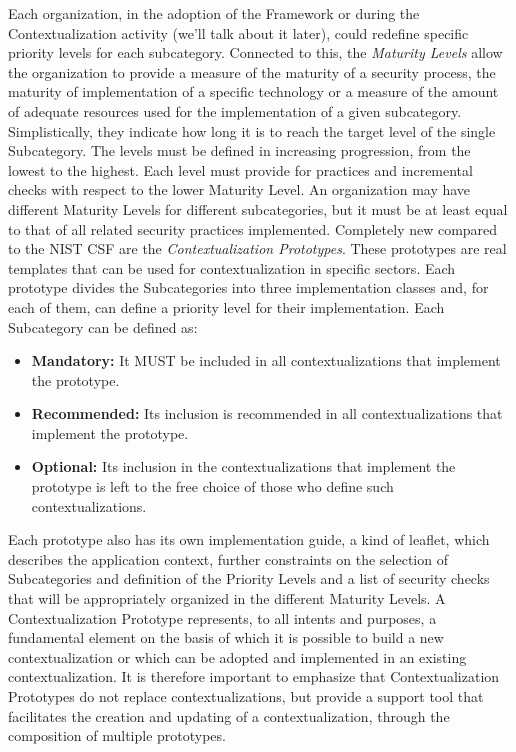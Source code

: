 Each organization, in the adoption of the Framework or during the Contextualization activity (we'll talk about it later), could redefine specific priority levels for each subcategory. Connected to this, the \textit{Maturity Levels} allow the organization to provide a measure of the maturity of a security process, the maturity of implementation of a specific technology or a measure of the amount of adequate resources used for the implementation of a given subcategory. Simplistically, they indicate how long it is to reach the target level of the single Subcategory. The levels must be defined in increasing progression, from the lowest to the highest. Each level must provide for practices and incremental checks with respect to the lower Maturity Level. An organization may have different Maturity Levels for different subcategories, but it must be at least equal to that of all related security practices implemented.\newline
Completely new compared to the NIST CSF are the \textit{Contextualization Prototypes}. These prototypes are real templates that can be used for contextualization in specific sectors. Each prototype divides the Subcategories into three implementation classes and, for each of them, can define a priority level for their implementation. Each Subcategory can be defined as:
\begin{itemize}
    \item \textbf{Mandatory: } It MUST be included in all contextualizations that implement the prototype.
    \item \textbf{Recommended: } Its inclusion is recommended in all contextualizations that implement the prototype.
    \item \textbf{Optional: } Its inclusion in the contextualizations that implement the prototype is left to the free choice of those who define such contextualizations.
\end{itemize}
Each prototype also has its own implementation guide, a kind of leaflet, which describes the application context, further constraints on the selection of Subcategories and definition of the Priority Levels and a list of security checks that will be appropriately organized in the different Maturity Levels.
A Contextualization Prototype represents, to all intents and purposes, a fundamental element on the basis of which it is possible to build a new contextualization or which can be adopted and implemented in an existing contextualization. It is therefore important to emphasize that Contextualization Prototypes do not replace contextualizations, but provide a support tool that facilitates the creation and updating of a contextualization, through the composition of multiple prototypes.
